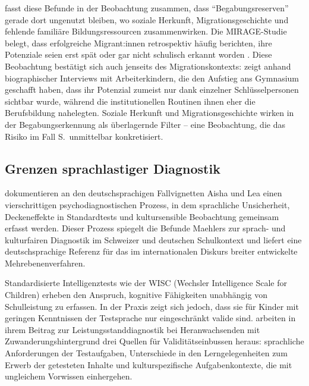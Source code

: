 \documentclass[ngerman, a4paper]{article}
\begin{document}
\textcite[S.\,576--585]{stamm2021fehlenderblick} fasst diese 
Befunde in der Beobachtung zusammen, dass \enquote{Begabungsreserven}
gerade dort ungenutzt bleiben, wo soziale Herkunft, Migrationsgeschichte und fehlende
familiäre Bildungsressourcen zusammenwirken. Die MIRAGE-Studie belegt, dass
erfolgreiche Migrant:innen retrospektiv häufig berichten, ihre Potenziale seien erst spät
oder gar nicht schulisch erkannt worden \parencite[S.\,102--115]{stamm2014mirage}. Diese
Beobachtung bestätigt sich auch jenseits des Migrationskontexts:
\textcite{stamm2025vonuntennachoben} zeigt anhand biographischer Interviews
mit Arbeiterkindern, die den Aufstieg ans Gymnasium geschafft haben, dass
ihr Potenzial zumeist nur dank einzelner Schlüsselpersonen sichtbar wurde,
während die institutionellen Routinen ihnen eher die Berufsbildung
nahelegten. Soziale Herkunft und Migrationsgeschichte wirken in der
Begabungserkennung als überlagernde Filter -- eine Beobachtung, die das
Risiko im Fall S.\ unmittelbar konkretisiert.

\subsection{Grenzen sprachlastiger Diagnostik}

\textcite[S.\,239--251]{gauckreimann2021psychdiagnostik} dokumentieren an den
deutschsprachigen Fallvignetten Aisha und Lea einen vierschrittigen
psychodiagnostischen Prozess, in dem sprachliche Unsicherheit,
Deckeneffekte in Standardtests und kultursensible Beobachtung gemeinsam
erfasst werden. Dieser Prozess spiegelt die Befunde Maehlers zur sprach-
und kulturfairen Diagnostik im Schweizer und deutschen Schulkontext und
liefert eine deutschsprachige Referenz für das im internationalen Diskurs
breiter entwickelte Mehrebenenverfahren.

Standardisierte Intelligenztests wie der WISC (Wechsler Intelligence Scale
for Children) erheben den Anspruch, kognitive Fähigkeiten unabhängig von
Schulleistung zu erfassen. In der Praxis zeigt sich jedoch, dass sie für
Kinder mit geringen Kenntnissen der Testsprache nur eingeschränkt valide
sind. \textcite[S.\,152--165,\,187\,f.]{haag2018leistungsstanddiagnostik}
arbeiten in ihrem Beitrag zur Leistungsstanddiagnostik bei Heranwachsenden
mit Zuwanderungshintergrund drei Quellen für Validitätseinbussen heraus:
sprachliche Anforderungen der Testaufgaben, Unterschiede in den
Lerngelegenheiten zum Erwerb der getesteten Inhalte und kulturspezifische
Aufgabenkontexte, die mit ungleichem Vorwissen einhergehen.
\end{document}
